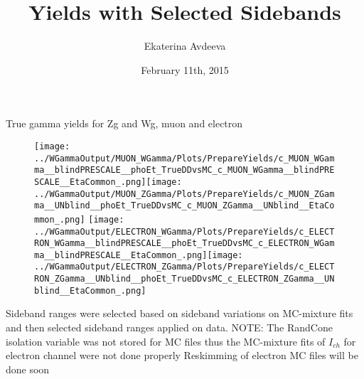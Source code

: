 \documentclass{beamer}
\title{Yields with Selected Sidebands}
\author{Ekaterina Avdeeva}
\institute{University of Nebraska - Lincoln}
\date{February 11th, 2015}
\begin{document}
\begin{frame}
\titlepage
\end{frame}




\begin{frame}{True gamma yields for Zg and Wg, muon and electron}
  \begin{figure}
    \centering
    \texttt{[image: ../WGammaOutput/MUON\_WGamma/Plots/PrepareYields/c\_MUON\_WGamma\_\_blindPRESCALE\_\_phoEt\_TrueDDvsMC\_c\_MUON\_WGamma\_\_blindPRESCALE\_\_EtaCommon\_.png]}\texttt{[image: ../WGammaOutput/MUON\_ZGamma/Plots/PrepareYields/c\_MUON\_ZGamma\_\_UNblind\_\_phoEt\_TrueDDvsMC\_c\_MUON\_ZGamma\_\_UNblind\_\_EtaCommon\_.png]}
    \texttt{[image: ../WGammaOutput/ELECTRON\_WGamma/Plots/PrepareYields/c\_ELECTRON\_WGamma\_\_blindPRESCALE\_\_phoEt\_TrueDDvsMC\_c\_ELECTRON\_WGamma\_\_blindPRESCALE\_\_EtaCommon\_.png]}\texttt{[image: ../WGammaOutput/ELECTRON\_ZGamma/Plots/PrepareYields/c\_ELECTRON\_ZGamma\_\_UNblind\_\_phoEt\_TrueDDvsMC\_c\_ELECTRON\_ZGamma\_\_UNblind\_\_EtaCommon\_.png]}
  \end{figure}
  \scriptsize Sideband ranges were selected based on sideband variations on MC-mixture fits and then selected sideband ranges applied on data. 
  \scriptsize NOTE: The RandCone isolation variable was not stored for MC files thus the MC-mixture fits of $I_{ch}$ for electron channel were not done properly 
  \scriptsize Reskimming of electron MC files will be done soon
\end{frame}
\end{document}
